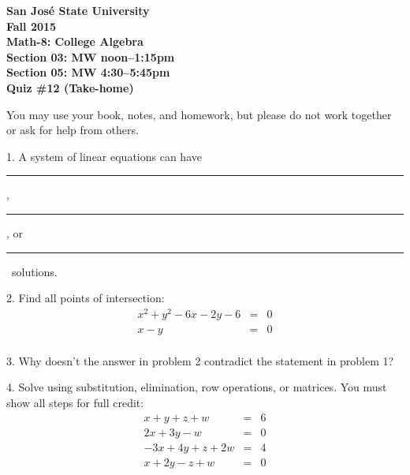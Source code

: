 \documentclass[letterpaper, 12pt]{article}
\begin{document}
\begin{center}
\bfseries
San Jos\'{e} State University \\
Fall 2015 \\
Math-8: College Algebra \\
Section 03: MW noon--1:15pm \\
Section 05: MW 4:30--5:45pm \\
\bigskip
Quiz \#12 (Take-home)
\end{center}

\bigskip

You may use your book, notes, and homework, but please do not work together or
ask for help from others.

\bigskip

\newcommand{\fillin}{\rule{1.5in}{1pt}}

1. A system of linear equations can have \fillin, \fillin, or
\fillin\ solutions.

\vspace{0.5in}

2. Find all points of intersection:
\begin{eqnarray*}
x^2+y^2-6x-2y-6 &=& 0 \\
x-y &=& 0 \\
\end{eqnarray*}

\newpage

3. Why doesn't the answer in problem 2 contradict the statement in problem 1?

\vspace{1in}

4. Solve using substitution, elimination, row operations, or matrices. You must
show all steps for full credit:
\begin{eqnarray*}
x+y+z+w &=& 6 \\
2x+3y-w &=& 0 \\
-3x+4y+z+2w &=& 4 \\
x+2y-z+w &=& 0 \\
\end{eqnarray*}
\end{document}
